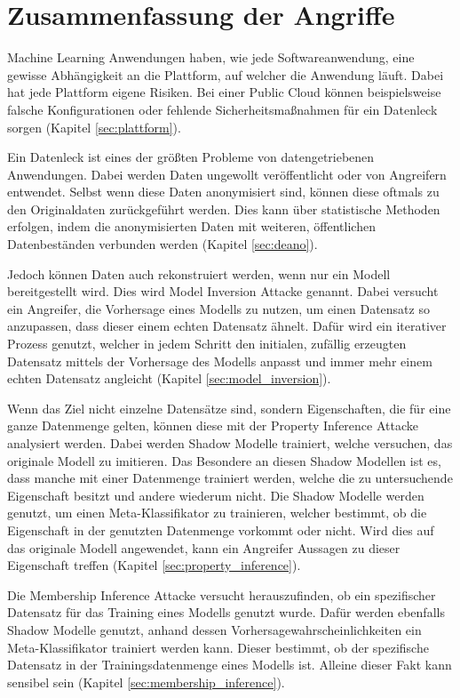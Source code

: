 \section{Zusammenfassung der Angriffe}

Machine Learning Anwendungen haben, wie jede Softwareanwendung, eine gewisse Abhängigkeit an die Plattform, auf welcher die Anwendung läuft.
Dabei hat jede Plattform eigene Risiken. 
Bei einer Public Cloud können beispielsweise falsche Konfigurationen oder fehlende Sicherheitsmaßnahmen für ein Datenleck sorgen (Kapitel \ref{sec:plattform}).

Ein Datenleck ist eines der größten Probleme von datengetriebenen Anwendungen.
Dabei werden Daten ungewollt veröffentlicht oder von Angreifern entwendet.
Selbst wenn diese Daten anonymisiert sind, können diese oftmals zu den Originaldaten zurückgeführt werden.
Dies kann über statistische Methoden erfolgen, indem die anonymisierten Daten mit weiteren, öffentlichen Datenbeständen verbunden werden (Kapitel \ref{sec:deano}).

Jedoch können Daten auch rekonstruiert werden, wenn nur ein Modell bereitgestellt wird.
Dies wird Model Inversion Attacke genannt.
Dabei versucht ein Angreifer, die Vorhersage eines Modells zu nutzen, um einen Datensatz so anzupassen, dass dieser einem echten Datensatz ähnelt.
Dafür wird ein iterativer Prozess genutzt, welcher in jedem Schritt den initialen, zufällig erzeugten Datensatz mittels der Vorhersage des Modells anpasst und immer mehr einem echten Datensatz angleicht (Kapitel \ref{sec:model_inversion}).

Wenn das Ziel nicht einzelne Datensätze sind, sondern Eigenschaften, die für eine ganze Datenmenge gelten, können diese mit der Property Inference Attacke analysiert werden.
Dabei werden Shadow Modelle trainiert, welche versuchen, das originale Modell zu imitieren.
Das Besondere an diesen Shadow Modellen ist es, dass manche mit einer Datenmenge trainiert werden, welche die zu untersuchende Eigenschaft besitzt und andere wiederum nicht.
Die Shadow Modelle werden genutzt, um einen Meta-Klassifikator zu trainieren, welcher bestimmt, ob die Eigenschaft in der genutzten Datenmenge vorkommt oder nicht.
Wird dies auf das originale Modell angewendet, kann ein Angreifer Aussagen zu dieser Eigenschaft treffen (Kapitel \ref{sec:property_inference}).


Die Membership Inference Attacke versucht herauszufinden, ob ein spezifischer Datensatz für das Training eines Modells genutzt wurde.
Dafür werden ebenfalls Shadow Modelle genutzt, anhand dessen Vorhersagewahrscheinlichkeiten ein Meta-Klassifikator trainiert werden kann.
Dieser bestimmt, ob der spezifische Datensatz in der Trainingsdatenmenge eines Modells ist.
Alleine dieser Fakt kann sensibel sein (Kapitel \ref{sec:membership_inference}).


